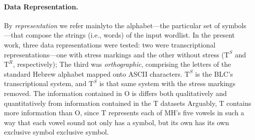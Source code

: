 \paragraph{Data Representation.} 
By \emph{representation} we refer mainlyto the alphabet---the
particular set of symbols---that compose the strings (i.e., words) of the input wordlist.
In the present work, three data representations were tested: two were transcriptional representations---one with stress markings and the other without stress ($\text{T}^{S}$ and $\text{T}^{R}$, respectively); The third was \emph{orthographic}, comprising the letters of the standard Hebrew alphabet mapped onto ASCII characters.
$\text{T}^{S}$ is the BLC's transcriptional system, and $\text{T}^{S}$ is that same system with the stress markings removed. 
The information contained in O is differs both qualitatively and quantitatively from information contained in the T datasets  
Arguably, T contains more information than O,
since T represents each of \ac{MH}'s five vowels in such a way that each vowel sound not only has a symbol, but its own
has its own exclusive symbol 
exclusive symbol.

